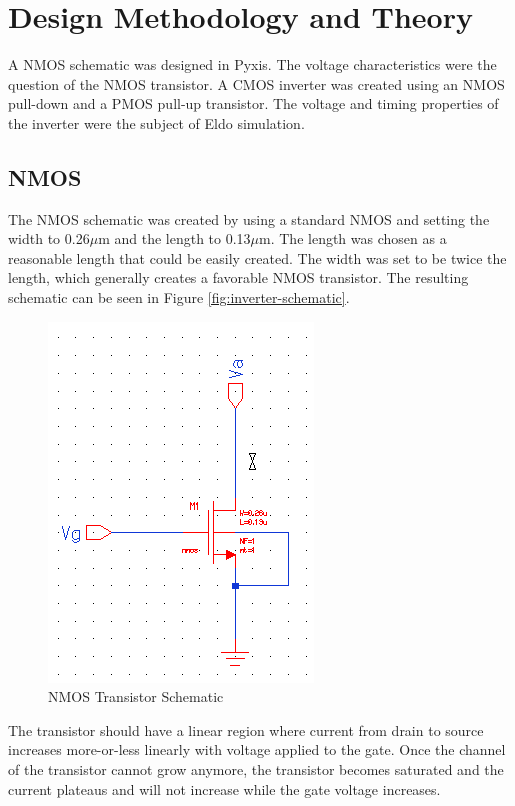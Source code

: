\documentclass[11pt]{article}
\begin{document}
\section{Design Methodology and Theory}
	
	A NMOS schematic was designed in Pyxis. The voltage characteristics were the question of the NMOS transistor. A CMOS inverter was created using an NMOS pull-down and a PMOS pull-up transistor. The voltage and timing properties of the inverter were the subject of Eldo simulation. 


	\subsection{NMOS}
	
		The NMOS schematic was created by using a standard NMOS and setting the width to 0.26$\mu$m and the length to 0.13$\mu$m. The length was chosen as a reasonable length that could be easily created. The width was set to be twice the length, which generally creates a favorable NMOS transistor. The resulting schematic can be seen in Figure \ref{fig:inverter-schematic}.
				
		\begin{figure}[H]
			\centering
			\includegraphics[width=0.5\linewidth]{"Pictures/Transistor Schematic"}
			\caption[NMOS Transistor Schematic]{NMOS Transistor Schematic}
			\label{fig:transistor-schematic}
		\end{figure}
	
		The transistor should have a linear region where current from drain to source increases more-or-less linearly with voltage applied to the gate. Once the channel of the transistor cannot grow anymore, the transistor becomes saturated and the current plateaus and will not increase while the gate voltage increases.  
\end{document}
